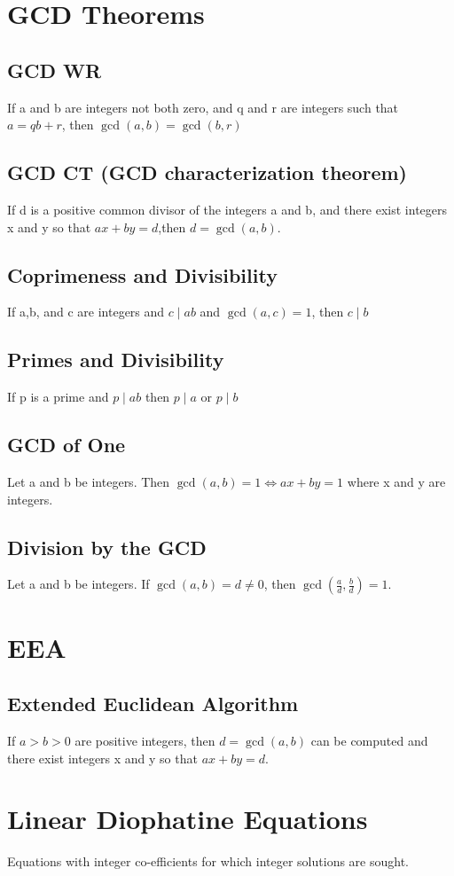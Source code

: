 \documentclass[12pt]{article}
\begin{document}
\section{GCD Theorems}
\subsection{GCD WR}
If a and b are integers not both zero, and q and r are integers such that
$a=qb+r$, then $\gcd(a,b)=\gcd(b,r)$
\subsection{GCD CT (GCD characterization theorem)}
If d is a positive common divisor of the integers a and b, and there exist
integers x and y so that $ax+by=d$,then $d=\gcd(a,b)$.
\subsection{Coprimeness and Divisibility}
If a,b, and c are integers and $c\mid ab$ and $\gcd(a,c)=1$, then $c\mid b$
\subsection{Primes and Divisibility}
If p is a prime and $p\mid ab$ then $p\mid a$ or $p\mid b$
\subsection{GCD of One}
Let a and b be integers. Then $\gcd(a,b)=1 \iff ax+by=1$ where x and y are
integers.
\subsection{Division by the GCD}
Let a and b be integers. If $\gcd(a,b)=d\neq 0$, then $\gcd(\frac{a}{d},
\frac{b}{d})=1$.
\section{EEA}
\subsection{Extended Euclidean Algorithm}
If $a>b>0$ are positive integers, then $d=\gcd(a,b)$ can be computed and there
exist integers x and y so that $ax+by=d$.
\section{Linear Diophatine Equations}
Equations with integer co-efficients for which integer solutions are sought.
\end{document}
